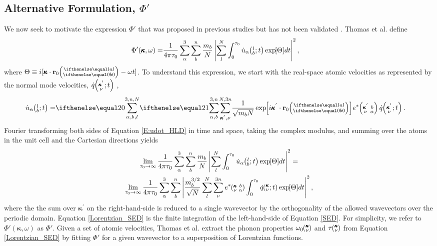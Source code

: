 \subsection{\label{S:Subsection_Proposed_SED}Alternative Formulation, 
$\Phi'$}
We now seek to motivate the 
expression $\Phi'$ that was proposed in previous studies but has not 
been validated 
\cite{maruyama_molecular_2003,shiomi_non-fourier_2006,
thomas_predicting_2010}. Thomas et al. 
\cite{thomas_predicting_2010} define
\begin{equation}\label{Lorentzian_SED}
\begin{split}
\Phi'(\pmb{\kappa},\omega) =& \frac{1}{4\pi\tau_0} \sum_\alpha^3 
\sum_b^n \frac{m_b}{N}
\left| \sum_l^N  \int_{0}^{\tau_0} \dot{u}_{\alpha}\mspace{-4.0mu}\left(\mspace{-8.0mu} \begin{smallmatrix}&l \\&b\end{smallmatrix}\mspace{-2.0mu};t\right) \exp\mspace{-5.0mu}\left[\Theta\right]\mspace{-3.0mu} dt 
\right|^2,
\end{split}
\end{equation}
where $\Theta \equiv i[\pmb{\kappa}\cdot\mathbf{r}_0\ab{l}{0}-\omega t]$. 
To understand this expression, we start with the real-space atomic 
velocities as 
represented by the normal mode velocities, $\dot{q}\mspace{-4.0mu}\left(\mspace{-8.0mu} \begin{smallmatrix}&\pmb{\kappa}^{'} \\&\nu \end{smallmatrix}\mspace{-2.0mu};t\right)$ 
\cite{dove_introduction_1993},
\begin{equation}\label{E:udot_HLD}
\begin{split}
\dot{u}_{\alpha}\lbt = &\SUMprime{2}{} \frac{1}{\sqrt{m_bN}} 
\EXP{i\pmb{\kappa}^{'}\cdot\mathbf{r}_0\ab{l}{0}} e^*\kpvba 
\dot{q}\kpvt{}{}{}.
\end{split}
\end{equation}
Fourier transforming both sides of Equation \eqref{E:udot_HLD} in time 
and space, taking the complex modulus, and summing over the atoms in 
the unit cell 
and the Cartesian directions yields
\begin{multline}\label{SED}
\lim_{\tau_0\rightarrow\infty}\frac{1}{4\pi\tau_0} \sum_\alpha^3 
\sum_b^n \frac{m_b}{N} 
\left\lvert \sum_l^N  \int_{0}^{\tau_0} \dot{u}_{\alpha}\lbt 
\EXP{\Theta} dt \right\rvert^2 =
\\ \lim_{\tau_0\rightarrow\infty}\frac{1}{4\pi\tau_0} \sum_\alpha^3 
\sum_b^n 
\left\lvert \frac{m_b^{3/2}}{\sqrt{N}} \sum_l^N \sum_{\nu}^{3n} e^*\kvba 
\int_{0}^{\tau_0}\dot{q}\kvt\EXP{\Theta}dt \right\rvert^2 ,
\end{multline}
where the the sum over $\pmb{\kappa}^{'}$ on the right-hand-side is 
reduced to a 
single wavevector by the orthogonality of the allowed wavevectors over 
the periodic 
domain. Equation \eqref{Lorentzian_SED} is the finite integration of the 
left-hand-side of Equation \eqref{SED}. For simplicity, we refer to 
$\Phi'(\pmb{\kappa},\omega)$ 
as $\Phi'$. Given a set of atomic velocities, Thomas et al. extract the 
phonon properties 
$\omega_0\mspace{-4.0mu}\left(\mspace{-8.0mu} \begin{smallmatrix}&\pmb{\kappa} \\&\nu \end{smallmatrix}\mspace{-3.0mu}\right)$ and $\tau\mspace{-4.0mu}\left(\mspace{-8.0mu} \begin{smallmatrix}&\pmb{\kappa} \\&\nu \end{smallmatrix}\mspace{-3.0mu}\right)$ from Equation \eqref{Lorentzian_SED} by 
fitting $\Phi'$ for a 
given wavevector to a superposition of Lorentzian functions.

